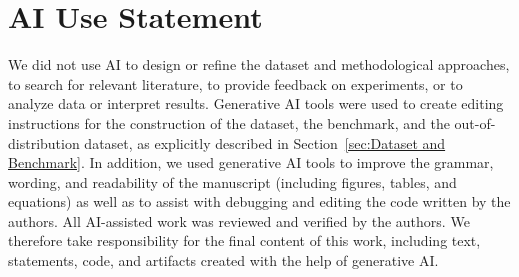 \documentclass{article}
\begin{document}




\section*{AI Use Statement}
We did not use AI to design or refine the dataset and methodological approaches, to search for relevant literature, to provide feedback on experiments, or to analyze data or interpret results. Generative AI tools were used to create editing instructions for the construction of the dataset, the benchmark, and the out-of-distribution dataset, as explicitly described in Section~\ref{sec:Dataset and Benchmark}. In addition, we used generative AI tools to improve the grammar, wording, and readability of the manuscript (including figures, tables, and equations) as well as to assist with debugging and editing the code written by the authors. All AI-assisted work was reviewed and verified by the authors. We therefore take responsibility for the final content of this work, including text, statements, code, and artifacts created with the help of generative AI.




\appendix


\end{document}
